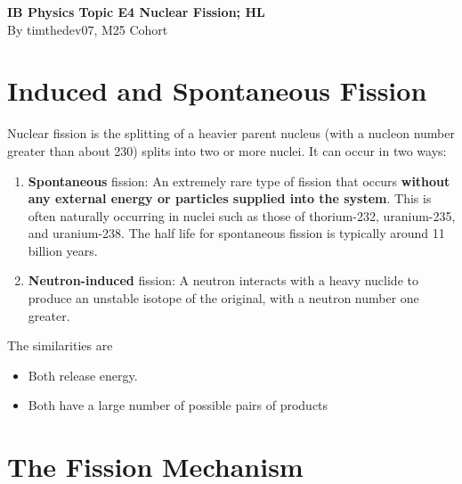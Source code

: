 \documentclass[a4paper,12pt]{article}
\let\oldsection\section
\renewcommand\section{\clearpage\oldsection}
\begin{document}
\pagestyle{fancy}


\begin{titlepage}
  \begin{center}

    \vspace*{8cm}
    \textbf{\Large {IB Physics Topic E4 Nuclear Fission; HL}} \\
    \vspace*{1cm}
    \large{By timthedev07, M25 Cohort}

  \end{center}
\end{titlepage}

\pagebreak
\tableofcontents
\pagebreak

\clearpage
\setcounter{page}{1}

\section{Induced and Spontaneous Fission}

Nuclear fission is the splitting of a heavier parent nucleus (with a nucleon number greater than about 230) splits into two or more nuclei. It can occur in two ways:
\begin{enumerate}
  \item \textbf{Spontaneous} fission: An extremely rare type of fission that occurs \textbf{without any external energy or particles supplied into the system}. This is often naturally occurring in nuclei such as those of thorium-232, uranium-235, and uranium-238. The half life for spontaneous fission is typically around 11 billion years.
  \item \textbf{Neutron-induced} fission: A neutron interacts with a heavy nuclide to produce an unstable isotope of the original, with a neutron number one greater.
\end{enumerate}

The similarities are
\begin{itemize}
  \item Both release energy.
  \item Both have a large number of possible pairs of products
\end{itemize}

\section{The Fission Mechanism}
\end{document}
